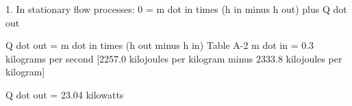 1. In stationary flow processes:  
0 = m dot in times (h in minus h out) plus Q dot out  

Q dot out = m dot in times (h out minus h in)  
Table A-2  
m dot in = 0.3 kilograms per second  
[2257.0 kilojoules per kilogram minus 2333.8 kilojoules per kilogram]  

Q dot out = 23.04 kilowatts